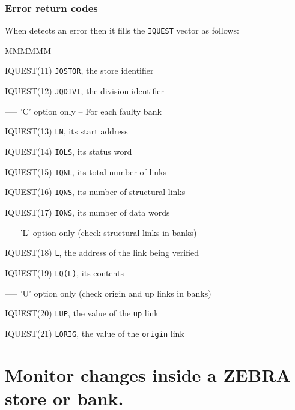 \subsubsection{Error return codes}
When  detects an error then it fills the
{\tt IQUEST} vector as follows:
\begin{DL}{MMMMMM}
\item[IQUEST(11)]{\tt JQSTOR}, the store identifier
\item[IQUEST(12)]{\tt JQDIVI}, the division identifier
\par
\item[ -----  'C' option only -- For each faulty bank]
\par
\item[IQUEST(13)]{\tt LN}, its start address
\item[IQUEST(14)]{\tt IQLS}, its status word
\item[IQUEST(15)]{\tt IQNL}, its total number of links
\item[IQUEST(16)]{\tt IQNS}, its number of structural links
\item[IQUEST(17)]{\tt IQNS}, its number of data words
\par
\item[ ----- 'L' option only (check structural links in banks)]
\par
\item[IQUEST(18)]{\tt L}, the address of the link being verified
\item[IQUEST(19)]{\tt LQ(L)}, its contents
\par
\item[ ----- 'U' option only (check origin and up links in banks)]
\par
\item[IQUEST(20)]{\tt LUP}, the value of the {\tt up} link
\item[IQUEST(21)]{\tt LORIG}, the value of the {\tt origin} link
\end{DL}
\section{Monitor changes inside a ZEBRA store or bank.}
